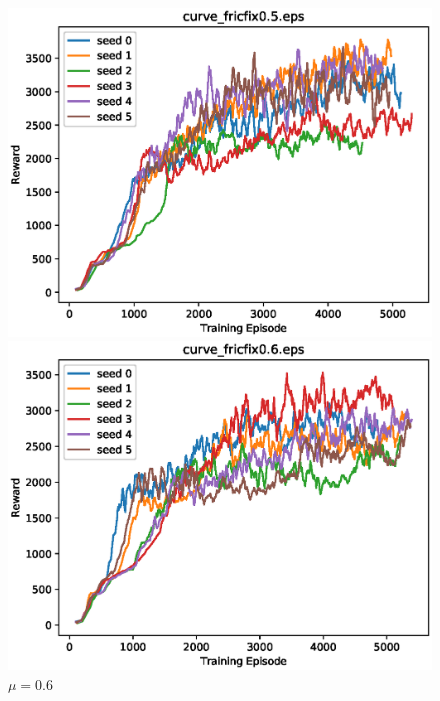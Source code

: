 \begin{figure}[p]
 \begin{minipage}{0.49\hsize}
  \begin{center}
 \includegraphics[width=.99\linewidth]{./fig/curve_fricfix0.5.eps}
  \caption{$\mu=0.5$
  }
  \end{center}
 \end{minipage}
 \begin{minipage}{0.49\hsize}
   \begin{center}
 \includegraphics[width=.99\linewidth]{./fig/curve_fricfix0.6.eps}
  \caption{$\mu=0.6$
     }
  \end{center}
 \end{minipage}
\end{figure}

